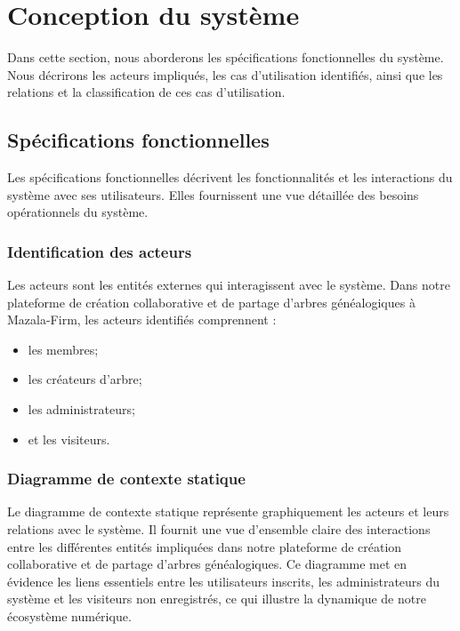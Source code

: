 \section{Conception du système}
Dans cette section, nous aborderons les spécifications fonctionnelles du
système. Nous décrirons les acteurs impliqués, les cas d’utilisation identifiés,
ainsi que les relations et la classification de ces cas d’utilisation.

\subsection{Spécifications fonctionnelles}
Les spécifications fonctionnelles décrivent les fonctionnalités et les interactions
du système avec ses utilisateurs. Elles fournissent une vue détaillée des
besoins opérationnels du système.

\subsubsection{Identification des acteurs}
Les acteurs sont les entités externes qui interagissent avec le système.
Dans notre plateforme de création collaborative et de partage d'arbres
généalogiques à Mazala-Firm, les acteurs identifiés comprennent :

\begin{itemize}
  \item les membres;

  \item les créateurs d'arbre;

  \item les administrateurs;

  \item et les visiteurs.

\end{itemize}

\subsubsection{Diagramme de contexte statique}
Le diagramme de contexte statique représente graphiquement les acteurs et leurs
relations avec le système. Il fournit une vue d’ensemble claire des interactions
entre les différentes entités impliquées dans notre plateforme de création
collaborative et de partage d’arbres généalogiques. Ce diagramme met en évidence
les liens essentiels entre les utilisateurs inscrits, les administrateurs du
système et les visiteurs non enregistrés, ce qui illustre la dynamique de
notre écosystème numérique.

